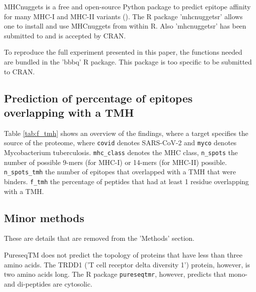 
MHCnuggets is a free and open-source Python package to predict 
epitope affinity for many MHC-I and MHC-II variants (\cite{shao2020high}).
The R package 'mhcnuggetsr' allows one to install and use MHCnuggets
from within R.
Also 'mhcnuggetsr' has been submitted to and is accepted by CRAN.


To reproduce the full experiment presented in this paper,
the functions needed are bundled in the 'bbbq' R package.
This package is too specific to be submitted to CRAN.

\subsection{Prediction of percentage of epitopes overlapping with a TMH}

Table \ref{tab:f_tmh} shows an overview of the findings,
where a target specifies the source of the proteome,
where \verb;covid; denotes SARS-CoV-2 and \verb;myco; denotes
Mycobacterium tuberculosis. \verb;mhc_class; denotes the MHC
class, \verb;n_spots; the number of possible 9-mers (for MHC-I) 
or 14-mers (for MHC-II) possible. \verb;n_spots_tmh; the
number of epitopes that overlapped with a TMH that were binders. 
\verb;f_tmh; the percentage of peptides that had at least 1 residue
overlapping with a TMH.



\subsection{Minor methods}

These are details that are removed from the 'Methods' section.

PureseqTM does not predict the topology
of proteins that have less than three amino acids. 
The TRDD1 ('T cell receptor delta diversity 1') protein,
however, is two amino acids long. 
The R package \verb;pureseqtmr;, however, 
predicts that mono- and di-peptides are cytosolic. 

